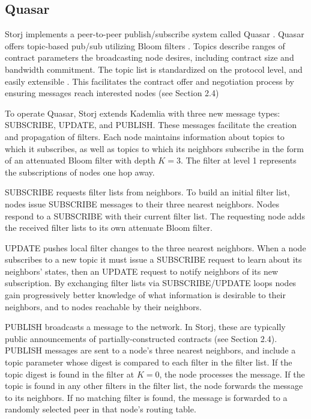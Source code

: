 \documentclass[a4paper,10pt]{article}
\begin{document}
\subsection{Quasar}
Storj implements a peer-to-peer publish/subscribe system called Quasar
\cite{8}\cite{9}. Quasar offers topic-based pub/sub utilizing Bloom filters
\cite{10}. Topics describe ranges of contract parameters the broadcasting node
desires, including contract size and bandwidth commitment. The topic list is
standardized on the protocol level, and easily extensible \cite{11}. This
facilitates the contract offer and negotiation process by ensuring messages
reach interested nodes (see Section 2.4)

To operate Quasar, Storj extends Kademlia with three new message types:
SUBSCRIBE, UPDATE, and PUBLISH. These messages facilitate the creation and
propagation of filters. Each node maintains information about topics to which it
subscribes, as well as topics to which its neighbors subscribe in the form of an
attenuated Bloom filter with depth $ K = 3 $. The filter at level 1 represents
the subscriptions of nodes one hop away.

SUBSCRIBE requests filter lists from neighbors. To build an initial filter list,
nodes issue SUBSCRIBE messages to their three nearest neighbors. Nodes respond
to a SUBSCRIBE with their current filter list. The requesting node adds the
received filter lists to its own attenuate Bloom filter.

UPDATE pushes local filter changes to the three nearest neighbors. When a node
subscribes to a new topic it must issue a SUBSCRIBE request to learn about its
neighbors’ states, then an UPDATE request to notify neighbors of its new
subscription. By exchanging filter lists via SUBSCRIBE/UPDATE loops nodes gain
progressively better knowledge of what information is desirable to their
neighbors, and to nodes reachable by their neighbors.

PUBLISH broadcasts a message to the network. In Storj, these are typically
public announcements of partially-constructed contracts (see Section 2.4).
PUBLISH messages are sent to a node’s three nearest neighbors, and include a
topic parameter whose digest is compared to each filter in the filter list. If
the topic digest is found in the filter at $ K = 0 $, the node processes the
message. If the topic is found in any other filters in the filter list, the node
forwards the message to its neighbors. If no matching filter is found, the
message is forwarded to a randomly selected peer in that node’s routing table.
\end{document}
